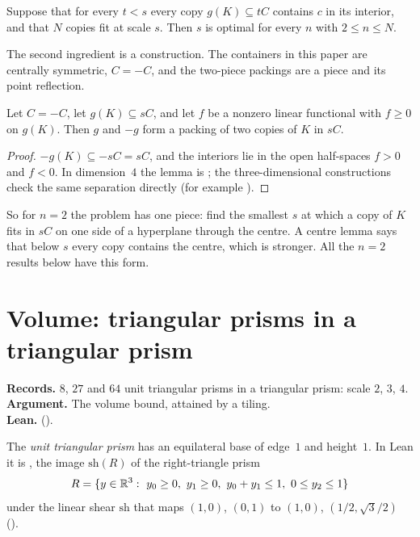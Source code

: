 \documentclass[11pt,a4paper]{article}
\begin{document}
\begin{lemma}\label{lem:plateau}
Suppose that for every $t<s$ every copy $g(K)\subseteq tC$ contains $c$ in its interior, and that $N$ copies fit at scale $s$. Then $s$ is optimal for every $n$ with $2\le n\le N$.
\end{lemma}

The second ingredient is a construction. The containers in this paper are centrally symmetric, $C=-C$, and the two-piece packings are a piece and its point reflection.

\begin{lemma}\label{lem:reflect}
Let $C=-C$, let $g(K)\subseteq sC$, and let $f$ be a nonzero linear functional with $f\ge 0$ on $g(K)$. Then $g$ and $-g$ form a packing of two copies of $K$ in $sC$.
\end{lemma}
\begin{proof}
$-g(K)\subseteq -sC=sC$, and the interiors lie in the open half-spaces $f>0$ and $f<0$. In dimension~$4$ the lemma is ; the three-dimensional constructions check the same separation directly (for example ).
\end{proof}

So for $n=2$ the problem has one piece: find the smallest $s$ at which a copy of $K$ fits in $sC$ on one side of a hyperplane through the centre. A centre lemma says that below $s$ every copy contains the centre, which is stronger. All the $n=2$ results below have this form.

\section{Volume: triangular prisms in a triangular prism}\label{sec:volume}

\begin{summarybox}
\textbf{Records.} $8$, $27$ and $64$ unit triangular prisms in a triangular prism: scale $2$, $3$, $4$.\\
\textbf{Argument.} The volume bound, attained by a tiling.\\
\textbf{Lean.}  ().
\end{summarybox}

The \emph{unit triangular prism} has an equilateral base of edge~$1$ and height~$1$. In Lean it is , the image $\mathrm{sh}(R)$ of the right-triangle prism
\[
R=\{y\in\R^3:\ y_0\ge0,\ y_1\ge0,\ y_0+y_1\le1,\ 0\le y_2\le1\}
\]
under the linear shear $\mathrm{sh}$ that maps $(1,0)$, $(0,1)$ to $(1,0)$, $(1/2,\sqrt3/2)$ ().
\end{document}
